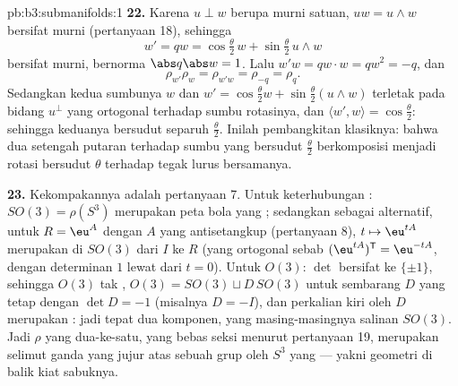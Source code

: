 \begin{solution}{pb:b3:submanifolds:1}
\textbf{22.} Karena $u \perp w$ berupa murni satuan, $uw =
u\wedge w$ bersifat murni (pertanyaan 18), sehingga
\[
w' = qw = \cos\tfrac\theta2\,w + \sin\tfrac\theta2\,u\wedge
w
\]
bersifat murni, bernorma $\abs q\abs w = 1$. Lalu $w'w = qw\cdot w
= qw^2 = -q$, dan
\[
\rho_{w'}\rho_w = \rho_{w'w} = \rho_{-q} = \rho_q .
\]
Sedangkan kedua sumbunya $w$ dan $w' = \cos\frac\theta2 w +
\sin\frac\theta2(u\wedge w)$ terletak pada bidang $u^\perp$
yang ortogonal terhadap sumbu rotasinya, dan $\langle w', w\rangle
= \cos\frac\theta2$: sehingga keduanya bersudut separuh
$\frac\theta2$. Inilah pembangkitan klasiknya: bahwa dua
setengah putaran terhadap sumbu yang bersudut $\frac\theta2$
berkomposisi menjadi rotasi bersudut $\theta$ terhadap tegak lurus
bersamanya.

\textbf{23.} Kekompakannya adalah pertanyaan 7. Untuk keterhubungan :
$SO(3) = \rho(S^3)$ merupakan peta  bola yang
; sedangkan sebagai alternatif, untuk $R = \eu^{A}$
dengan $A$ yang antisetangkup (pertanyaan 8), $t \mapsto \eu^{tA}$
merupakan  di $SO(3)$ dari $I$ ke $R$ (yang ortogonal sebab
$(\eu^{tA})^{\mathsf T} = \eu^{-tA}$, dengan determinan $1$ lewat
 dari $t = 0$). Untuk $O(3)$: $\det$ bersifat 
ke $\{\pm1\}$, sehingga $O(3)$ tak , $O(3) = SO(3)
\sqcup D\,SO(3)$ untuk sembarang $D$ yang tetap dengan $\det D = -1$
(misalnya $D = -I$), dan perkalian kiri oleh $D$ merupakan
: jadi tepat dua komponen, yang masing-masingnya salinan
$SO(3)$. Jadi $\rho$ yang dua-ke-satu, yang bebas seksi menurut pertanyaan
19, merupakan selimut ganda yang jujur atas sebuah grup 
 oleh $S^3$ yang  --- yakni geometri di balik
kiat sabuknya.


\end{solution}

